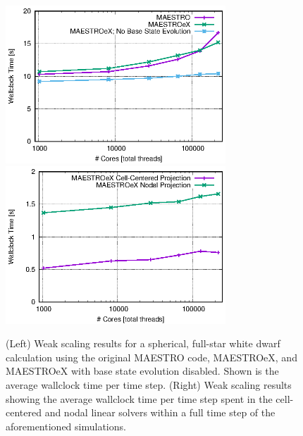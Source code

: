 \begin{figure}[htb]
\begin{center}
\includegraphics[width=3.25in]{./figs/MAESTRO_scaling1} \hspace{0.5em}
\includegraphics[width=3.25in]{./figs/MAESTRO_scaling2}
\caption{\label{fig:scaling} (Left) Weak scaling results for a spherical, full-star white dwarf calculation using the original MAESTRO code, MAESTROeX, and MAESTROeX with base state evolution disabled.  Shown is the average wallclock time per time step.
(Right) Weak scaling results showing the average wallclock time per time step spent in the cell-centered and nodal linear solvers within a full time step of the aforementioned simulations.}
\end{center}
\end{figure}

